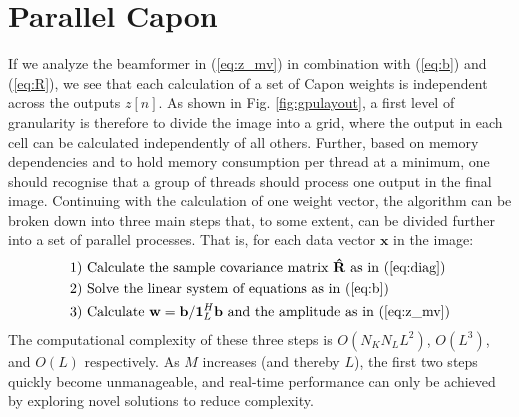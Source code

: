 \documentclass[12pt,journal,onecolumn]{IEEEtran}
\newcommand{\mat}[1]{\mathbf{#1}}
\renewcommand{\vec}[1]{\mathbf{#1}}
\begin{document}
\section{Parallel Capon}\label{sec:meth}
If we analyze the beamformer in (\ref{eq:z_mv}) in combination with (\ref{eq:b}) and (\ref{eq:R}), we see that each calculation of a set of Capon weights is independent across the outputs $z[n]$. As shown in Fig. \ref{fig:gpulayout}, a first level of granularity is therefore to divide the image into a grid, where the output in each cell can be calculated independently of all others. Further, based on memory dependencies and to hold memory consumption per thread at a minimum, one should recognise that a group of threads should process one output in the final image. Continuing with the calculation of one weight vector, the algorithm can be broken down into three main steps that, to some extent, can be divided further into a set of parallel processes. That is, for each data vector $\vec{x}$ in the image:
\begin{align*}
\text{1) } &\text{Calculate the sample covariance matrix } \mat{\hat{R}} \text{ as in } \text{(\ref{eq:diag})}\\
\text{2) } &\text{Solve the linear system of equations as in (\ref{eq:b}})\\ %
\text{3) } &\text{Calculate } \vec{w} = \vec{b}/\vec{1}_{L}^H\vec{b} \text{ and the amplitude as in (\ref{eq:z_mv})}
\end{align*}
The computational complexity of these three steps is $O(N_KN_LL^2)$, $O(L^3)$, and $O(L)$ respectively. As $M$ increases (and thereby $L$), the first two steps quickly become unmanageable, and real-time performance can only be achieved by exploring novel solutions to reduce complexity. 
\end{document}
